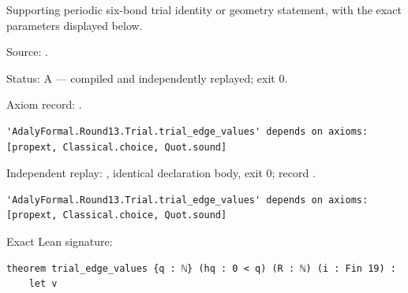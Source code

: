 \begin{theorem}[bp-416]
\label{bp-416}
\leanok
Supporting periodic six-bond trial identity or geometry statement, with the exact parameters displayed below.

\par Source: \texttt{}.
\par Status: A — compiled and independently replayed; exit 0.
\par Axiom record: \texttt{}.
\begin{verbatim}
'AdalyFormal.Round13.Trial.trial_edge_values' depends on axioms: [propext, Classical.choice, Quot.sound]
\end{verbatim}
\par Independent replay: \texttt{}, identical declaration body, exit 0; record \texttt{}.
\begin{verbatim}
'AdalyFormal.Round13.Trial.trial_edge_values' depends on axioms: [propext, Classical.choice, Quot.sound]
\end{verbatim}
\par Exact Lean signature:
\begin{verbatim}
theorem trial_edge_values {q : ℕ} (hq : 0 < q) (R : ℕ) (i : Fin 19) :
    let v
\end{verbatim}
\end{theorem}

